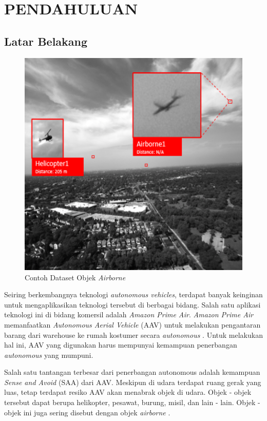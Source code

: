 \chapter{PENDAHULUAN}
\section{Latar Belakang}
    \begin{figure} [H]
        \centering
        \includegraphics[scale=0.4]{figures/dataset-example-labeled.png}
        \caption{Contoh Dataset Objek \emph{Airborne}}
        \label{fig:airborne-object-example-1}
    \end{figure}
    \vspace{-2ex}
    Seiring berkembangnya teknologi \emph{autonomous vehicles}, terdapat banyak keinginan untuk mengaplikasikan teknologi tersebut di berbagai bidang.
    Salah satu aplikasi teknologi ini di bidang komersil adalah \emph{Amazon Prime Air}.
    \emph{Amazon Prime Air} memanfaatkan \emph{Autonomous Aerial Vehicle} (AAV) untuk melakukan pengantaran barang dari warehouse ke rumah kostumer secara \emph{autonomous} \parencite{prime_air}.
    Untuk melakukan hal ini, AAV yang digunakan harus mempunyai kemampuan penerbangan \emph{autonomous} yang mumpuni.

    Salah satu tantangan terbesar dari penerbangan autonomous adalah kemampuan \emph{Sense and Avoid} (SAA) dari AAV.
    Meskipun di udara terdapat ruang gerak yang luas, tetap terdapat resiko AAV akan menabrak objek di udara.
    Objek - objek tersebut dapat berupa helikopter, pesawat, burung, misil, dan lain - lain.
    Objek - objek ini juga sering disebut dengan objek \emph{airborne} \parencite{aot_docs}.

